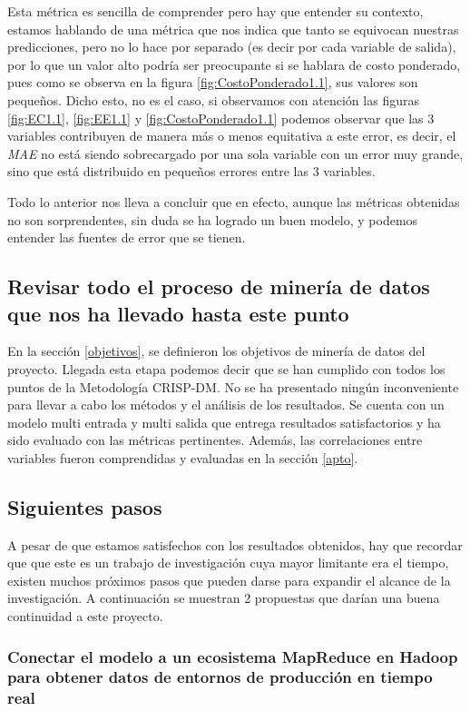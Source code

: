 \documentclass{article}
\begin{document}
Esta métrica es sencilla de comprender pero hay que entender su contexto, estamos hablando de una métrica que nos indica que tanto se equivocan nuestras predicciones, pero no lo hace por separado (es decir por cada variable de salida), por lo que un valor alto podría ser preocupante si se hablara de costo ponderado, pues como se observa en la figura \ref{fig:CostoPonderado1.1}, sus valores son pequeños. Dicho esto, no es el caso, si observamos con atención las figuras \ref{fig:EC1.1}, \ref{fig:EE1.1} y \ref{fig:CostoPonderado1.1} podemos observar que las 3 variables contribuyen de manera más o menos equitativa a este error, es decir, el \emph{MAE} no está siendo sobrecargado por una sola variable con un error muy grande, sino que está distribuido en pequeños errores entre las 3 variables.

Todo lo anterior nos lleva a concluir que en efecto, aunque las métricas obtenidas no son sorprendentes, sin duda se ha logrado un buen modelo, y podemos entender las fuentes de error que se tienen.

\subsection{Revisar todo el proceso de minería de datos que nos ha llevado hasta este punto}
En la sección \ref{objetivos}, se definieron los objetivos de minería de datos del proyecto. Llegada esta etapa podemos decir que se han cumplido con todos los puntos de la Metodología CRISP-DM. No se ha presentado ningún inconveniente para llevar a cabo los métodos y el análisis de los resultados. Se cuenta con un modelo multi entrada y multi salida que entrega resultados satisfactorios y ha sido evaluado con las métricas pertinentes. Además, las correlaciones entre variables fueron comprendidas y evaluadas en la sección \ref{apto}.  

\subsection{Siguientes pasos}

A pesar de que estamos satisfechos con los resultados obtenidos,
hay que recordar que que este es un trabajo de investigación cuya mayor limitante era el tiempo, existen muchos próximos pasos que pueden darse para expandir el alcance de la investigación. A continuación se muestran 2 propuestas que darían una buena continuidad a este proyecto.

\subsubsection{Conectar el modelo a un ecosistema MapReduce en Hadoop para obtener datos de entornos de producción en tiempo real}
\end{document}
